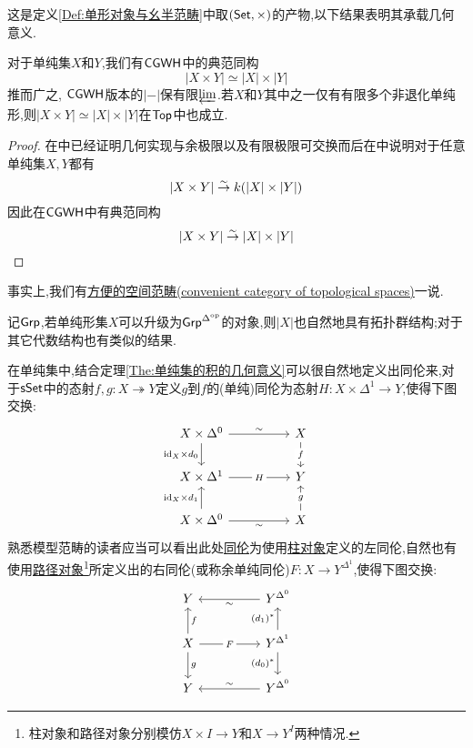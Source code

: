 这是定义\ref{Def:单形对象与幺半范畴}中取$(\mathsf{Set},\times)$的产物,以下结果表明其承载几何意义.
\begin{theorem}\label{The:单纯集的积的几何意义}
    对于单纯集$X$和$Y$,我们有$\mathsf{CGWH}$中的典范同构
    \[
    |X\times Y| \simeq |X|\times |Y|
    \]
    推而广之, $\mathsf{CGWH}$版本的$|-|$保有限$\underleftarrow{\lim}$.若$X$和$Y$其中之一仅有有限多个非退化单纯形,则$|X\times Y| \simeq |X|\times |Y|$在$\mathsf{Top}$中也成立.
\end{theorem}
\begin{proof}
    在\parencite[Chapter 3, $\S$3,(3.1)]{Gabriel-Zisman67}中已经证明几何实现与余极限以及有限极限可交换而后在\parencite[Chapter 3, $\S$3,(3.5)]{Gabriel-Zisman67}中说明对于任意单纯集$X,Y$都有
    \[
    |X \times Y| \stackrel{\sim}{\rightarrow} k(|X| \times |Y|)
    \]
    因此在$\mathsf{CGWH}$中有典范同构
    \[
    |X \times Y| \stackrel{\sim}{\rightarrow} |X| \times |Y|
    \]
\end{proof}
\begin{remark}
    事实上,我们有\href{https://ncatlab.org/nlab/show/convenient+category+of+topological+spaces}{方便的空间范畴(convenient category of topological spaces)}一说.
\end{remark}
\begin{corollary}
    记$\mathsf{Grp}$,若单纯形集$X$可以升级为$\mathsf{Grp}^{\Delta^{\operatorname{op}}}$的对象,则$|X|$也自然地具有拓扑群结构;对于其它代数结构也有类似的结果.
\end{corollary}
在单纯集中,结合定理\ref{The:单纯集的积的几何意义}可以很自然地定义出同伦来,对于$\mathsf{sSet}$中的态射$f,g : X \twoheadrightarrow Y$定义$g$到$f$的(单纯)同伦为态射$H: X\times \Delta^1 \to Y$,使得下图交换:
\[\begin{tikzcd}
	{X\times \Delta^0} && X \\
	{X\times \Delta^1} && Y \\
	{X\times \Delta^0} && X
	\arrow["\sim", from=1-1, to=1-3]
	\arrow["{\identity_X \times d_0}"', from=1-1, to=2-1]
	\arrow["f"{description}, from=1-3, to=2-3]
	\arrow["H"{description}, from=2-1, to=2-3]
	\arrow["{\identity_X\times d_1}", from=3-1, to=2-1]
	\arrow["\sim"', from=3-1, to=3-3]
	\arrow["g"{description}, from=3-3, to=2-3]
\end{tikzcd}\]
熟悉模型范畴的读者应当可以看出此处\href{https://ncatlab.org/nlab/show/homotopy+in+a+model+category}{同伦}为使用\href{https://ncatlab.org/nlab/show/cylinder+object}{柱对象}定义的左同伦,自然也有使用\href{https://ncatlab.org/nlab/show/path+space+object}{路径对象}\footnote{柱对象和路径对象分别模仿$X \times I\to Y$和$X \to Y^I$两种情况.}所定义出的右同伦(或称余单纯同伦)$F : X \to Y^{\Delta^1}$,使得下图交换:
\[\begin{tikzcd}
	Y && {Y^{\Delta^0}} \\
	X && {Y^{\Delta^1}} \\
	Y && {Y^{\Delta^0}}
	\arrow["\sim", from=1-3, to=1-1]
	\arrow["f"', from=2-1, to=1-1]
	\arrow["F"{description}, from=2-1, to=2-3]
	\arrow["g", from=2-1, to=3-1]
	\arrow["{(d_1)^*}", from=2-3, to=1-3]
	\arrow["{(d_0)^*}"', from=2-3, to=3-3]
	\arrow["\sim"', from=3-3, to=3-1]
\end{tikzcd}\]

